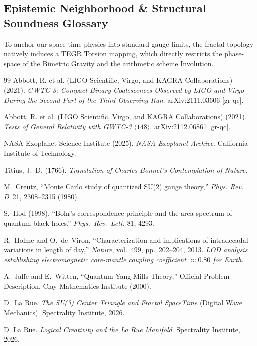 \subsection*{Epistemic Neighborhood \& Structural Soundness Glossary}
To anchor our space-time physics into standard gauge limits, the fractal topology natively induces a TEGR Torsion mapping, which directly restricts the phase-space of the Bimetric Gravity and the arithmetic scheme Involution.



\vspace{2em}
\begin{thebibliography}{99}
Abbott, R. et al. (LIGO Scientific, Virgo, and KAGRA Collaborations) (2021).
\textit{GWTC-3: Compact Binary Coalescences Observed by LIGO and Virgo During the Second Part of the Third Observing Run}.
arXiv:2111.03606 [gr-qc].

Abbott, R. et al. (LIGO Scientific, Virgo, and KAGRA Collaborations) (2021).
\textit{Tests of General Relativity with GWTC-3} $\langle 148 \rangle$.
arXiv:2112.06861 [gr-qc].

NASA Exoplanet Science Institute (2025).
\textit{NASA Exoplanet Archive}. California Institute of Technology.

Titius, J.~D. (1766).
\textit{Translation of Charles Bonnet's Contemplation of Nature}.

M.~Creutz,
``Monte Carlo study of quantized SU(2) gauge theory,''
\emph{Phys. Rev. D}\ 21, 2308--2315 (1980).

S.~Hod (1998).
``Bohr's correspondence principle and the area spectrum of quantum black holes.''
\textit{Phys.\ Rev.\ Lett.} 81, 4293.

R.~Holme and O.~de~Viron,
``Characterization and implications of intradecadal variations in length of day,''
\emph{Nature}, vol.~499, pp.~202--204, 2013.
\textit{LOD analysis establishing electromagnetic core-mantle coupling coefficient
$\approx 0.80$ for Earth.}

A.~Jaffe and E.~Witten,
``Quantum Yang-Mills Theory,''
Official Problem Description, Clay Mathematics Institute (2000).

D.~La Rue.
\textit{The SU(3) Center Triangle and Fractal SpaceTime} (Digital Wave Mechanics).
Spectrality Institute, 2026.

D. La Rue.
\textit{Logical Creativity and the La Rue Manifold}.
Spectrality Institute, 2026.


\end{thebibliography}
